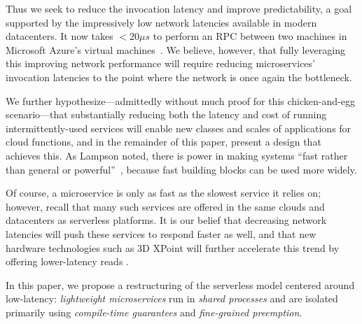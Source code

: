 Thus we seek to reduce the invocation latency and improve predictability, a
goal supported by the impressively low network latencies available in modern
datacenters. It now takes $<20\mu{}s$ to perform an RPC between two machines in
Microsoft Azure's virtual machines~\cite{Firestone:nsdi2018}. We believe,
however, that fully leveraging this improving network performance will require
reducing microservices' invocation latencies to the point where the network is
once again the bottleneck.

We further hypothesize---admittedly without much proof for this chicken-and-egg
scenario---that substantially reducing both the latency and cost of running
intermittently-used services will enable new classes and scales of applications
for cloud functions, and in the remainder of this paper, present a design that
achieves this.  As Lampson noted, there is power in making systems 
``fast rather than general or powerful''~\cite{Lampson1983}, because fast
building blocks can be used more widely.

Of course, a microservice is only as fast as the slowest service it relies
on; however, recall that many such services are offered in the same clouds and
datacenters as serverless platforms.  It is our belief that decreasing network
latencies will push these services to respond faster as well, and that new hardware
technologies such as 3D XPoint will further accelerate this trend by offering
lower-latency reads .

In this paper, we propose a restructuring of the serverless model centered around
low-latency: \textit{lightweight microservices} run in \textit{shared processes}
and are isolated primarily using \textit{compile-time guarantees} and
\textit{fine-grained preemption}.



